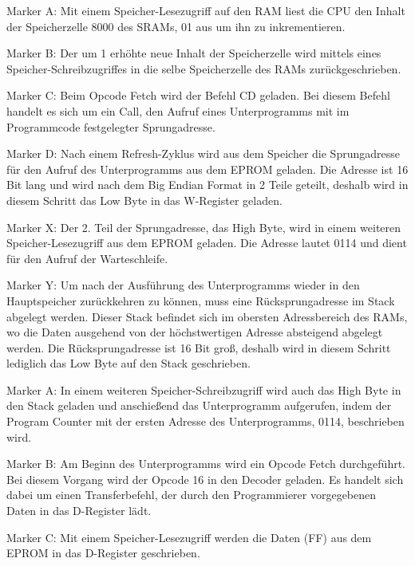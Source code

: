 Marker A: Mit einem Speicher-Lesezugriff auf den RAM liest die CPU den Inhalt der Speicherzelle 8000 des SRAMs, 01 aus um ihn zu inkrementieren.

Marker B: Der um 1 erhöhte neue Inhalt der Speicherzelle wird mittels eines Speicher-Schreibzugriffes in die selbe Speicherzelle des RAMs zurückgeschrieben.

Marker C: Beim Opcode Fetch wird der Befehl CD geladen. Bei diesem Befehl handelt es sich um ein Call, den Aufruf eines Unterprogramms mit im Programmcode festgelegter Sprungadresse.

Marker D: Nach einem Refresh-Zyklus wird aus dem Speicher die Sprungadresse für den Aufruf des Unterprogramms aus dem EPROM geladen. Die Adresse ist 16 Bit lang und wird nach dem Big Endian Format in 2 Teile geteilt, deshalb wird in diesem Schritt das Low Byte in das W-Register geladen.

Marker X: Der 2. Teil der Sprungadresse, das High Byte, wird in einem weiteren Speicher-Lesezugriff aus dem EPROM geladen. Die Adresse lautet 0114 und dient für den Aufruf der Warteschleife.

Marker Y: Um nach der Ausführung des Unterprogramms wieder in den Hauptspeicher zurückkehren zu können, muss eine Rücksprungadresse im Stack abgelegt werden. Dieser Stack befindet sich im obersten Adressbereich des RAMs, wo die Daten ausgehend von der höchstwertigen Adresse absteigend abgelegt werden. Die Rücksprungadresse ist 16 Bit groß, deshalb wird in diesem Schritt lediglich das Low Byte auf den Stack geschrieben.

Marker A: In einem weiteren Speicher-Schreibzugriff wird auch das High Byte in den Stack geladen und anschießend das Unterprogramm aufgerufen, indem der Program Counter mit der ersten Adresse des Unterprogramms, 0114, beschrieben wird.

Marker B: Am Beginn des Unterprogramms wird ein Opcode Fetch durchgeführt. Bei diesem Vorgang wird der Opcode 16 in den Decoder geladen. Es handelt sich dabei um einen Transferbefehl, der durch den Programmierer vorgegebenen Daten in das D-Register lädt.

Marker C: Mit einem Speicher-Lesezugriff werden die Daten (FF) aus dem EPROM in das D-Register geschrieben.

